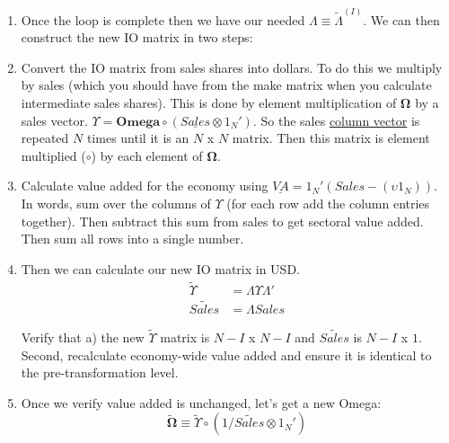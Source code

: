 \documentclass[12pt,english]{article}
\newcommand{\hlight}[1]{\textcolor{org}{#1}}
\begin{document}
\begin{enumerate}
\begin{enumerate}
		\item Then update $\tilde{\Lambda}^{(i)} = \tilde{\Lambda}^{(i-1)}\Phi_i$. The new $\tilde{\Lambda}^{(i)}$ matrix should be $N$ x $N-i$ \hlight{(Previous $\tilde{\Lambda}^{(i-1)}$ was $N$ x $N-(i-1)$)}.
		\item Remove the sector $s(i)$ from the dynamic sector list. 
	\end{enumerate}
	\item Once the loop is complete then we have our needed $\Lambda \equiv \tilde{\Lambda}^{(I)}$. We can then construct the new IO matrix in two steps:
	\item Convert the IO matrix from sales shares into dollars. To do this we multiply by sales (which you should have from the make matrix when you calculate intermediate sales shares). This is done by element multiplication of $\mathbf{\Omega}$ by a sales vector. $\Upsilon = \mathbf{Omega} \circ (\underline{Sales} \otimes 1_N')$. So the sales \underline{column vector} is repeated $N$ times until it is an $N$ x $N$ matrix. Then this matrix is element multiplied ($\circ$) by each element of $\mathbf{\Omega}$.
	\item Calculate value added for the economy using $\underline{VA} = 1_N'(Sales - (\upsilon 1_N))$. In words, sum over the columns of $\Upsilon$ (for each row add the column entries together). Then subtract this sum from sales to get sectoral value added. Then sum all rows into a single number.
	\item Then we can calculate our new IO matrix in USD.
	\begin{align*}
		\tilde{\Upsilon} &= \Lambda \Upsilon \Lambda'\\
		\tilde{Sales} &= \Lambda Sales
	\end{align*}
	
	Verify that a) the new $\tilde{\Upsilon}$ matrix is $N-I$ x $N-I$ and $\tilde{Sales}$ is $N-I$ x $1$. Second, recalculate economy-wide value added and ensure it is identical to the pre-transformation level.
	\item Once we verify value added is unchanged, let's get a new Omega:
	$$
		\mathbf{\tilde{\Omega}}\equiv \tilde{\Upsilon} \circ (1/\tilde{Sales} \otimes 1_N')
	$$
	
\end{enumerate}
\end{document}
